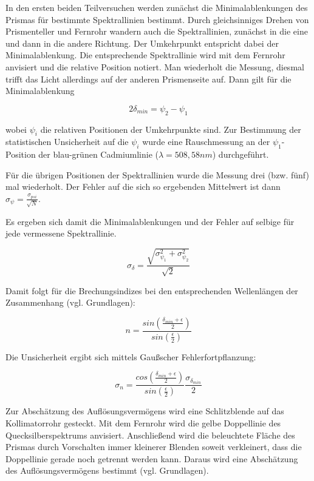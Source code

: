 \documentclass[12pt,a4paper]{article}
\begin{document}
	In den ersten beiden Teilversuchen werden zunächst die Minimalablenkungen des Prismas für bestimmte Spektrallinien bestimmt.
	Durch gleichsinniges Drehen von Prismenteller und Fernrohr wandern auch die Spektrallinien, zunächst in die eine und dann in die andere Richtung. Der Umkehrpunkt entspricht dabei der Minimalablenkung. Die entsprechende Spektrallinie wird mit dem Fernrohr anvisiert und die relative Position notiert. Man wiederholt die Messung, diesmal trifft das Licht allerdings auf der anderen Prismenseite auf. Dann gilt für die Minimalablenkung
	
	\begin{equation}
	2 \delta_{min} = \psi_2-\psi_1
	\end{equation}
	
	wobei $\psi_i$ die relativen Positionen der Umkehrpunkte sind.
	Zur Bestimmung der statistischen Unsicherheit auf die $\psi_i$ wurde eine Rauschmessung an der $\psi_1$-Position der blau-grünen Cadmiumlinie ($\lambda=508,58nm$) durchgeführt.
	
	Für die übrigen Positionen der Spektrallinien wurde die Messung drei (bzw. fünf) mal wiederholt. Der Fehler auf die sich so ergebenden Mittelwert ist dann $\sigma_{\psi}=\frac{\sigma_{psi}}{\sqrt{N}}$.
	
	Es ergeben sich damit die Minimalablenkungen und der Fehler auf selbige für jede vermessene Spektrallinie.
	
	\begin{equation}
	\sigma_{\delta} = \frac{\sqrt{\sigma_{\psi_1}^2+\sigma_{\psi_2}^2}}{\sqrt{2}}
	\end{equation}
	
	Damit folgt für die Brechungsindizes bei den entsprechenden Wellenlängen der Zusammenhang (vgl. Grundlagen):
	
	\begin{equation}
	n = \frac{sin(\frac{\delta_{min}+\epsilon}{2})}{sin(\frac{\epsilon}{2})}
	\end{equation}
	
	Die Unsicherheit ergibt sich mittels Gaußscher Fehlerfortpflanzung:
	
	\begin{equation}
	\sigma_n = \frac{cos(\frac{\delta_{min}+\epsilon}{2})}{sin(\frac{\epsilon}{2})} \frac{\sigma_{\delta_{min}}}{2}
	\end{equation}
	
	
	Zur Abschätzung des Auflösungsvermögens wird eine Schlitzblende auf das Kollimatorrohr gesteckt. Mit dem Fernrohr wird die gelbe Doppellinie des Quecksilberspektrums anvisiert.  Anschließend wird die beleuchtete Fläche des Prismas durch Vorschalten immer kleinerer Blenden soweit verkleinert, dass die Doppellinie gerade noch getrennt werden kann. Daraus wird eine Abschätzung des Auflösungsvermögens bestimmt (vgl. Grundlagen). 
	
\end{document}
